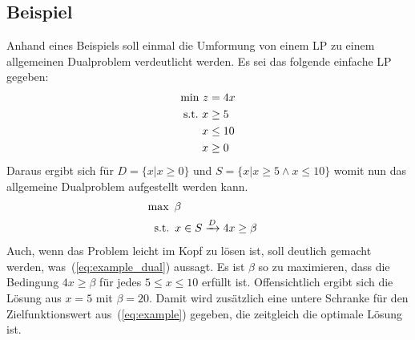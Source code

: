 \documentclass[a4paper, 11pt]{scrreprt}
\begin{document}
\subsection*{Beispiel}
Anhand eines Beispiels soll einmal die Umformung von einem LP zu einem allgemeinen
Dualproblem verdeutlicht werden. Es sei das folgende einfache LP gegeben:
\begin{align}
  \label{eq:example}
  \text{min}\,\, z &= 4x\notag\\
  \text{s.t.}\,\, x &\geq 5\\
  x &\leq 10\notag\\
  x &\geq 0\notag
\end{align}
Daraus ergibt sich für $D = \{x|x\geq 0\}$ und $S = \{x | x \geq 5 \land x \leq 10\}$
womit nun das allgemeine Dualproblem aufgestellt werden kann.
\begin{align}
  \label{eq:example_dual}
  \text{max}\,\,\, \beta\\
  \text{s.t.}\,\,\, x &\in S \xrightarrow{D} 4x \geq \beta\notag
\end{align}
Auch, wenn das Problem leicht im Kopf zu lösen ist, soll deutlich gemacht werden,
was~(\ref{eq:example_dual}) aussagt. Es ist $\beta$ so zu maximieren, dass die Bedingung
$4x \geq \beta$ für jedes $5 \leq x \leq 10$ erfüllt ist. Offensichtlich ergibt
sich die Lösung aus $x = 5$ mit  $\beta = 20$. Damit wird zusätzlich eine untere Schranke
für den Zielfunktionswert aus~(\ref{eq:example}) gegeben, die zeitgleich die optimale Lösung ist.
\end{document}
